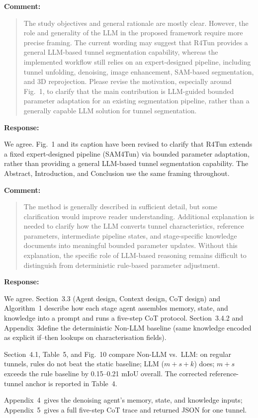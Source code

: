 \documentclass[11pt,a4paper]{article}
\newcommand{\MSReferenceTunnelTable}{Table~4}
\newcommand{\MSMainResultsTable}{Table~5}
\newcommand{\MSAblationBarFigure}{Fig.~10}
\newcommand{\MSAppendixRuleBaseline}{Appendix~3}
\newcommand{\MSAppendixContext}{Appendix~4}
\newcommand{\MSAppendixCoT}{Appendix~5}
\newenvironment{commentblock}{%
  \par\smallskip\noindent\textbf{Comment:}\par
  \begin{quote}\itshape\color{black}
}{%
  \end{quote}\smallskip
}
\newenvironment{responseblock}{%
  \par\smallskip\noindent\textbf{Response:}\par
  \begingroup\color{responsegreen}
}{%
  \endgroup\smallskip
}
\begin{document}
\begin{commentblock}
The study objectives and general rationale are mostly clear. However, the role and generality of the LLM in the proposed framework require more precise framing. The current wording may suggest that R4Tun provides a general LLM-based tunnel segmentation capability, whereas the implemented workflow still relies on an expert-designed pipeline, including tunnel unfolding, denoising, image enhancement, SAM-based segmentation, and 3D reprojection. Please revise the motivation, especially around Fig.~1, to clarify that the main contribution is LLM-guided bounded parameter adaptation for an existing segmentation pipeline, rather than a generally capable LLM solution for tunnel segmentation.
\end{commentblock}
\begin{responseblock}
We agree. Fig.~1 and its caption have been revised to clarify that R4Tun extends a fixed expert-designed pipeline (SAM4Tun) via bounded parameter adaptation, rather than providing a general LLM-based tunnel segmentation capability. The Abstract, Introduction, and Conclusion use the same framing throughout.
\end{responseblock}

\begin{commentblock}
The method is generally described in sufficient detail, but some clarification would improve reader understanding. Additional explanation is needed to clarify how the LLM converts tunnel characteristics, reference parameters, intermediate pipeline states, and stage-specific knowledge documents into meaningful bounded parameter updates. Without this explanation, the specific role of LLM-based reasoning remains difficult to distinguish from deterministic rule-based parameter adjustment.
\end{commentblock}
\begin{responseblock}
We agree. Section~3.3 (Agent design, Context design, CoT design) and Algorithm~1 describe how each stage agent assembles memory, state, and knowledge into a prompt and runs a five-step CoT protocol. Section~3.4.2 and \MSAppendixRuleBaseline define the deterministic Non-LLM baseline (same knowledge encoded as explicit if--then lookups on characterisation fields).

Section~4.1, \MSMainResultsTable, and \MSAblationBarFigure{} compare Non-LLM vs.\ LLM: on regular tunnels, rules do not beat the static baseline; LLM ($m+s+k$) does; $m+s$ exceeds the rule baseline by 0.15--0.21 mIoU overall. The corrected reference-tunnel anchor is reported in \MSReferenceTunnelTable.

\MSAppendixContext \ gives the denoising agent's memory, state, and knowledge inputs; \MSAppendixCoT \ gives a full five-step CoT trace and returned JSON for one tunnel.
\end{responseblock}
\end{document}

